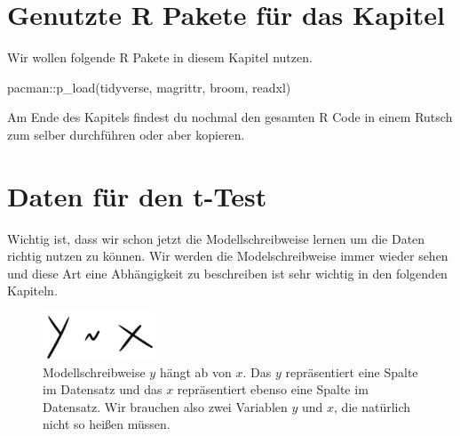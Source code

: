 \documentclass[
  letterpaper,
  DIV=11,
  oneside]{scrreport}
\newenvironment{Shaded}{\begin{snugshade}}{\end{snugshade}}
\newcommand{\FunctionTok}[1]{\textcolor[rgb]{0.28,0.35,0.67}{#1}}
\newcommand{\NormalTok}[1]{\textcolor[rgb]{0.00,0.23,0.31}{#1}}
\newcommand{\SpecialCharTok}[1]{\textcolor[rgb]{0.37,0.37,0.37}{#1}}
\begin{document}
\hypertarget{genutzte-r-pakete-fuxfcr-das-kapitel-3}{%
\section{Genutzte R Pakete für das
Kapitel}\label{genutzte-r-pakete-fuxfcr-das-kapitel-3}}

Wir wollen folgende R Pakete in diesem Kapitel nutzen.

\begin{Shaded}
\begin{Highlighting}[]
\NormalTok{pacman}\SpecialCharTok{::}\FunctionTok{p\_load}\NormalTok{(tidyverse, magrittr, broom, readxl)}
\end{Highlighting}
\end{Shaded}

Am Ende des Kapitels findest du nochmal den gesamten R Code in einem
Rutsch zum selber durchführen oder aber kopieren.

\hypertarget{daten-fuxfcr-den-t-test}{%
\section{Daten für den t-Test}\label{daten-fuxfcr-den-t-test}}

Wichtig ist, dass wir schon jetzt die Modellschreibweise lernen um die
Daten richtig nutzen zu können. Wir werden die Modelschreibweise immer
wieder sehen und diese Art eine Abhängigkeit zu beschreiben ist sehr
wichtig in den folgenden Kapiteln.

\begin{figure}

{\centering \includegraphics[width=0.3\textwidth,height=\textheight]{./images/statistical_modeling_0.png}

}

\caption{\label{fig-ttest-0}Modellschreibweise \(y\) hängt ab von \(x\).
Das \(y\) repräsentiert eine Spalte im Datensatz und das \(x\)
repräsentiert ebenso eine Spalte im Datensatz. Wir brauchen also zwei
Variablen \(y\) und \(x\), die natürlich nicht so heißen müssen.}

\end{figure}

{}
\end{document}

